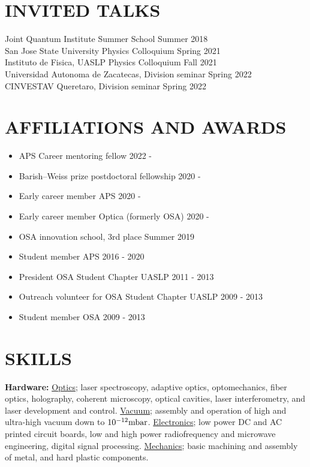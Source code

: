 \documentclass[margin]{res} %
\begin{document}
\begin{resume}
\section{INVITED TALKS}
{Joint Quantum Institute Summer School \hfill Summer 2018}\\
{San Jose State University Physics Colloquium \hfill Spring 2021}\\
{Instituto de Fisica, UASLP Physics Colloquium \hfill Fall 2021}\\
{Universidad Autonoma de Zacatecas, Division seminar \hfill Spring 2022}\\
{CINVESTAV Queretaro, Division seminar \hfill Spring 2022}

\section{AFFILIATIONS AND AWARDS}
 
\begin{itemize}
    \item{APS Career mentoring fellow \hfill 2022 -}
    \item{Barish--Weiss prize postdoctoral fellowship \hfill 2020 -}
    \item{Early career member APS \hfill 2020 -}
    \item{Early career member Optica (formerly OSA) \hfill 2020 -}
    \item{OSA innovation school, 3rd place \hfill Summer 2019}
    \item{Student member APS \hfill 2016 - 2020}
    \item{President OSA Student Chapter UASLP \hfill 2011 - 2013}
    \item{Outreach volunteer for OSA Student Chapter UASLP \hfill 2009 - 2013}
    \item{Student member OSA \hfill 2009 - 2013}
\end{itemize}

\section{SKILLS}

{\bf Hardware:}
{\underline{Optics};} laser spectroscopy, adaptive optics, optomechanics, fiber optics, holography, coherent microscopy, optical cavities, laser interferometry, and laser development and control. {\underline{Vacuum};} assembly and operation of high and ultra-high vacuum down to ${10^{-12} {\rm mbar}}$. {\underline {Electronics};} low power DC and AC printed circuit boards, low and high power radiofrequency and microwave engineering, digital signal processing. {\underline{Mechanics};} basic machining and assembly of metal, and hard plastic components.


\end{resume}
\end{document}
